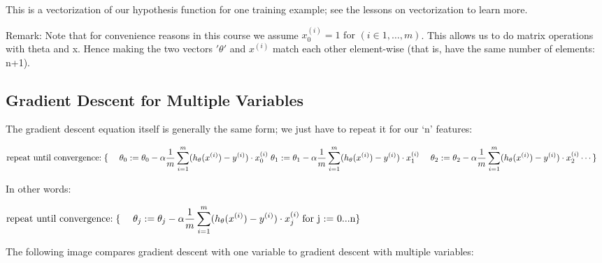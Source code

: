 \documentclass[
]{article}
\begin{document}
This is a vectorization of our hypothesis function for one training
example; see the lessons on vectorization to learn more.

Remark: Note that for convenience reasons in this course we assume
\(x_{0}^{(i)} =1 \text{ for } (i\in { 1,\dots, m } )\). This allows us
to do matrix operations with theta and x. Hence making the two vectors
\('\theta'\) and \(x^{(i)}\) match each other element-wise (that is,
have the same number of elements: n+1).

\hypertarget{gradient-descent-for-multiple-variables}{%
\subsection{Gradient Descent for Multiple
Variables}\label{gradient-descent-for-multiple-variables}}

The gradient descent equation itself is generally the same form; we just
have to repeat it for our `n' features:

\(\begin{align*} & \text{repeat until convergence:} \; \lbrace \newline \; & \theta_0 := \theta_0 - \alpha \frac{1}{m} \sum\limits_{i=1}^{m} (h_\theta(x^{(i)}) - y^{(i)}) \cdot x_0^{(i)}\newline \; & \theta_1 := \theta_1 - \alpha \frac{1}{m} \sum\limits_{i=1}^{m} (h_\theta(x^{(i)}) - y^{(i)}) \cdot x_1^{(i)} \newline \; & \theta_2 := \theta_2 - \alpha \frac{1}{m} \sum\limits_{i=1}^{m} (h_\theta(x^{(i)}) - y^{(i)}) \cdot x_2^{(i)} \newline & \cdots \newline \rbrace \end{align*}\)

In other words:

\(\begin{align*}& \text{repeat until convergence:} \; \lbrace \newline \; & \theta_j := \theta_j - \alpha \frac{1}{m} \sum\limits_{i=1}^{m} (h_\theta(x^{(i)}) - y^{(i)}) \cdot x_j^{(i)} \; & \text{for j := 0...n}\newline \rbrace\end{align*}\)

The following image compares gradient descent with one variable to
gradient descent with multiple variables:
\end{document}
